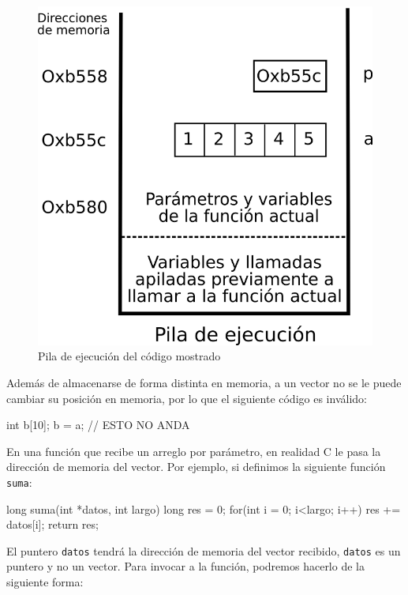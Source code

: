 \begin{figure}[htb]
\centering
\includegraphics{imagenes/vectores-pila}
\caption{Pila de ejecución del código mostrado}
\end{figure}

Además de almacenarse de forma distinta en memoria, a un vector no se le puede
cambiar su posición en memoria, por lo que el siguiente código es inválido:

\begin{codigo-c-plano}
  int b[10];
  b = a; // ESTO NO ANDA
\end{codigo-c-plano}

En una función que recibe un arreglo por parámetro, en realidad C le pasa la
dirección de memoria del vector. Por ejemplo, si definimos la siguiente
función \lstinline!suma!:

\begin{codigo-c-plano}
  long suma(int *datos, int largo)
  {
    long res = 0;
    for(int i = 0; i<largo; i++) {
        res += datos[i];
    }
    return res;
  }
\end{codigo-c-plano}

El puntero \lstinline!datos! tendrá la dirección de memoria del vector recibido, 
\lstinline!datos! es un puntero y no un vector.  Para invocar a la función,
podremos hacerlo de la siguiente forma:

